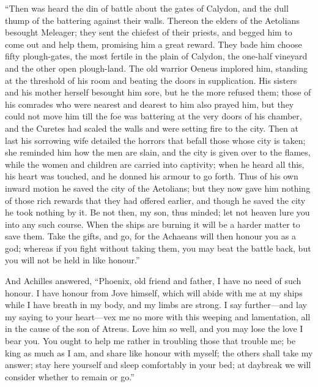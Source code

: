 “Then was heard the din of battle about the gates of Calydon, and the dull
thump of the battering against their walls. Thereon the elders of the
Aetolians besought Meleager; they sent the chiefest of their priests, and
begged him to come out and help them, promising him a great reward. They
bade him choose fifty plough-gates, the most fertile in the plain of
Calydon, the one-half vineyard and the other open plough-land. The old
warrior Oeneus implored him, standing at the threshold of his room and
beating the doors in supplication. His sisters and his mother herself
besought him sore, but he the more refused them; those of his comrades who
were nearest and dearest to him also prayed him, but they could not move
him till the foe was battering at the very doors of his chamber, and the
Curetes had scaled the walls and were setting fire to the city. Then at
last his sorrowing wife detailed the horrors that befall those whose city
is taken; she reminded him how the men are slain, and the city is given
over to the flames, while the women and children are carried into
captivity; when he heard all this, his heart was touched, and he donned
his armour to go forth. Thus of his own inward motion he saved the city of
the Aetolians; but they now gave him nothing of those rich rewards that
they had offered earlier, and though he saved the city he took nothing by
it. Be not then, my son, thus minded; let not heaven lure you into any
such course. When the ships are burning it will be a harder matter to save
them. Take the gifts, and go, for the Achaeans will then honour you as a
god; whereas if you fight without taking them, you may beat the battle
back, but you will not be held in like honour.”

And Achilles answered, “Phoenix, old friend and father, I have no need of
such honour. I have honour from Jove himself, which will abide with me at
my ships while I have breath in my body, and my limbs are strong. I say
further—and lay my saying to your heart—vex me no more with
this weeping and lamentation, all in the cause of the son of Atreus. Love
him so well, and you may lose the love I bear you. You ought to help me
rather in troubling those that trouble me; be king as much as I am, and
share like honour with myself; the others shall take my answer; stay here
yourself and sleep comfortably in your bed; at daybreak we will consider
whether to remain or go.”

